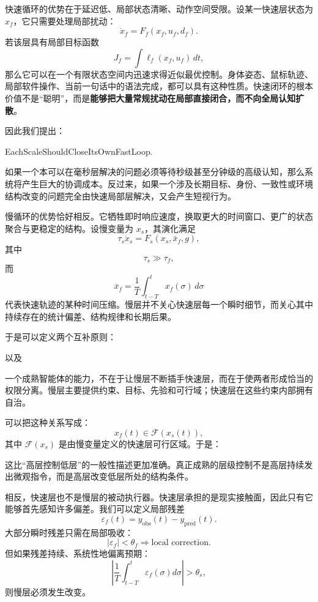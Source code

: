 快速循环的优势在于延迟低、局部状态清晰、动作空间受限。设某一快速层状态为 $x_f$，它只需要处理局部扰动：
\[
\dot{x}_f
=
F_f(x_f,u_f,d_f).
\]
若该层具有局部目标函数
\[
J_f
=
\int
\ell_f(x_f,u_f)\,dt,
\]
那么它可以在一个有限状态空间内迅速求得近似最优控制。身体姿态、鼠标轨迹、局部软件操作、当前一句话中的语法完成，都可以具有这种性质。快速闭环的根本价值不是“聪明”，而是\textbf{能够把大量常规扰动在局部直接闭合，而不向全局认知扩散}。

因此我们提出：
\begin{statementbox}
EachScaleShouldCloseItsOwnFastLoop.
\end{statementbox}
如果一个本可以在毫秒层解决的问题必须等待秒级甚至分钟级的高级认知，那么系统将产生巨大的协调成本。反过来，如果一个涉及长期目标、身份、一致性或环境结构改变的问题完全由快速局部层解决，又会产生短视行为。

慢循环的优势恰好相反。它牺牲即时响应速度，换取更大的时间窗口、更广的状态聚合与更稳定的结构。设慢变量为 $x_s$，其演化满足
\[
\tau_s\dot{x}_s
=
F_s
\left(
x_s,
\bar{x}_f,
g
\right),
\]
其中
\[
\tau_s\gg\tau_f,
\]
而
\[
\bar{x}_f
=
\frac{1}{T}
\int_{t-T}^{t}
x_f(\sigma)\,d\sigma
\]
代表快速轨迹的某种时间压缩。慢层并不关心快速层每一个瞬时细节，而关心其中持续存在的统计偏差、结构规律和长期后果。

于是可以定义两个互补原则：
\begin{statementbox}
\centering
{}
\end{statementbox}
以及
\begin{statementbox}
\centering
{}
\end{statementbox}
一个成熟智能体的能力，不在于让慢层不断插手快速层，而在于使两者形成恰当的权限分离。慢层主要提供约束、目标、先验和可行域；快速层在这些约束内部拥有自治。

可以把这种关系写成：
\[
x_f(t)
\in
\mathcal{F}
\left(
x_s(t)
\right),
\]
其中 $\mathcal{F}(x_s)$ 是由慢变量定义的快速层可行区域。于是：
\begin{statementbox}
\centering
{}
\end{statementbox}
这比“高层控制低层”的一般性描述更加准确。真正成熟的层级控制不是高层持续发出微观指令，而是高层改变低层所处的结构条件。

相反，快速层也不是慢层的被动执行器。快速层承担的是现实接触面，因此只有它能够首先感知许多偏差。我们可以定义局部残差
\[
\varepsilon_f(t)
=
y_{\mathrm{obs}}(t)
-
y_{\mathrm{pred}}(t).
\]
大部分瞬时残差只需在局部吸收：
\[
|\varepsilon_f|
<
\theta_f
\Rightarrow
\text{local correction}.
\]
但如果残差持续、系统性地偏离预期：
\[
\left|
\frac{1}{T}
\int_{t-T}^{t}
\varepsilon_f(\sigma)
d\sigma
\right|
>
\theta_s,
\]
则慢层必须发生改变。

